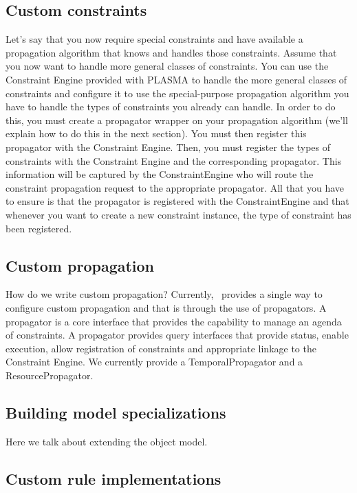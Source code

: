 \documentclass[10pt, letterpaper, twoside]{article}
\begin{document}
\subsection{Custom constraints}

Let's say that you now require special constraints and have available a
propagation algorithm that knows and handles those constraints.  Assume
that you now want to handle more general classes of constraints.  You can
use the Constraint Engine provided with PLASMA to handle the more general
classes of constraints and configure it to use the special-purpose
propagation algorithm you have to handle the types of constraints you
already can handle.  In order to do this, you must create a propagator
wrapper on your propagation algorithm (we'll explain how to do this in the
next section).  You must then register this propagator with the Constraint
Engine.  Then, you must register the types of constraints with the
Constraint Engine and the corresponding propagator.  This information will
be captured by the ConstraintEngine who will route the constraint
propagation request to the appropriate propagator.  All that you have to
ensure is that the propagator is registered with the ConstraintEngine and
that whenever you want to create a new constraint instance, the type of
constraint has been registered.

\subsection{Custom propagation}

How do we write custom propagation?  Currently, \ET\, provides a single way
to configure custom propagation and that is through the use of
propagators.  A propagator is a core interface that provides the capability
to manage an agenda of constraints.  A propagator provides query interfaces
that provide status, enable execution, allow registration of constraints
and appropriate linkage to the Constraint Engine.  We currently provide a
TemporalPropagator and a ResourcePropagator.

\subsection{Building model specializations}

Here we talk about extending the object model.

\subsection{Custom rule implementations}
\end{document}
